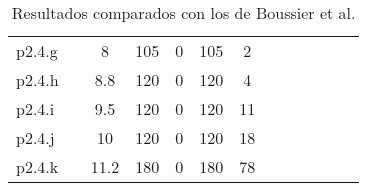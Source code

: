 \begin{table}[H]
\begin{tabularx}{\textwidth}{lXcXlXcXcXcXc}
p2.4.g                                                 &                             & 8                                                  & 105                 & 0                    & 105               & 2                  \\
p2.4.h                                                 &                             & 8.8                                                & 120                 & 0                    & 120               & 4                  \\
p2.4.i                                                 &                             & 9.5                                                & 120                 & 0                    & 120               & 11                 \\
p2.4.j                                                 &                             & 10                                                 & 120                 & 0                    & 120               & 18                 \\
p2.4.k                                                 &                             & 11.2                                               & 180                 & 0                    & 180               & 78                 \\ \hline
\end{tabularx}
\scriptsize{\caption{Resultados comparados con los de Boussier et al.\cite{exactAlgorithm}}\label{tab:table1}}
\end{table}